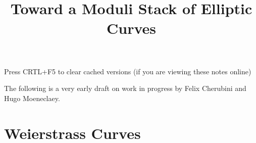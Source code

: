 \documentclass{../util/zariski}
\title{Toward a Moduli Stack of Elliptic Curves}
\begin{document}
\maketitle

\begin{center}
  \color{purple}
  \large{Press CRTL+F5 to clear cached versions}
  \large{(if you are viewing these notes online)}
\end{center}

The following is a very early draft on work in progress by Felix Cherubini and Hugo Moeneclaey.

\tableofcontents

\section{Weierstrass Curves}


\printindex

\printbibliography
\end{document}
